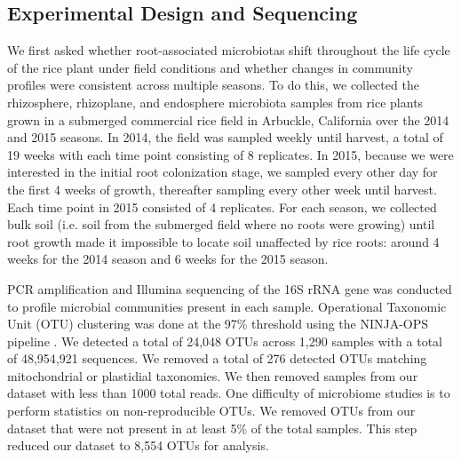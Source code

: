 \subsection{Experimental Design and Sequencing}
We first asked whether root-associated microbiotas shift throughout the life cycle of the rice plant under field conditions and whether changes in community profiles were consistent across multiple seasons. To do this, we collected the rhizosphere, rhizoplane, and endosphere microbiota samples from rice plants grown in a submerged commercial rice field in Arbuckle, California over the 2014 and 2015 seasons. In 2014, the field was sampled weekly until harvest, a total of 19 weeks with each time point consisting of 8 replicates. In 2015, because we were interested in the initial root colonization stage, we sampled every other day for the first 4 weeks of growth, thereafter sampling every other week until harvest. Each time point in 2015 consisted of 4 replicates. For each season, we collected bulk soil (i.e. soil from the submerged field where no roots were growing) until root growth made it impossible to locate soil unaffected by rice roots: around 4 weeks for the 2014 season and 6 weeks for the 2015 season.

PCR amplification and Illumina sequencing of the 16S rRNA gene was conducted to profile microbial communities present in each sample. Operational Taxonomic Unit (OTU) clustering was done at the 97\% threshold using the NINJA-OPS pipeline \cite{Al-Ghalith2016}. We detected a total of 24,048 OTUs across 1,290 samples with a total of 48,954,921 sequences. We removed a total of 276 detected OTUs matching mitochondrial or plastidial taxonomies. We then removed samples from our dataset with less than 1000 total reads. One difficulty of microbiome studies is to perform statistics on non-reproducible OTUs. We removed OTUs from our dataset that were not present in at least 5\% of the total samples. This step reduced our dataset to 8,554 OTUs for analysis.

